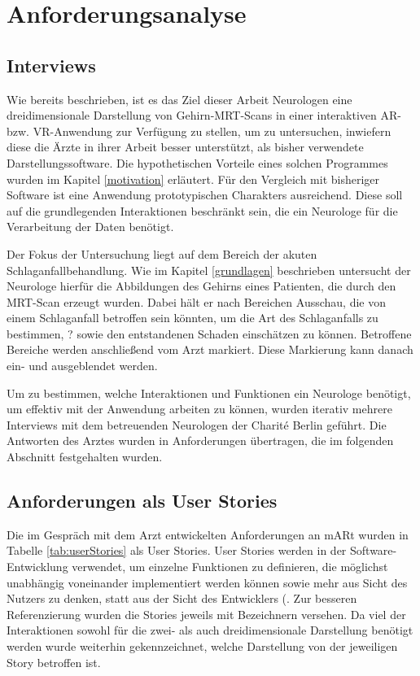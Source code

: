 
\chapter{Anforderungsanalyse}
\label{anforderung}

\section{Interviews}

Wie bereits beschrieben, ist es das Ziel dieser Arbeit Neurologen eine dreidimensionale Darstellung von Gehirn-MRT-Scans in einer interaktiven AR- bzw. VR-Anwendung zur Verfügung zu stellen, um zu untersuchen, inwiefern diese die Ärzte in ihrer Arbeit besser unterstützt, als bisher verwendete Darstellungssoftware. Die hypothetischen Vorteile eines solchen Programmes wurden im Kapitel \ref{motivation} erläutert.
Für den Vergleich mit bisheriger Software ist eine Anwendung prototypischen Charakters ausreichend. Diese soll auf die grundlegenden Interaktionen beschränkt sein, die ein Neurologe für die Verarbeitung der Daten benötigt.

Der Fokus der Untersuchung liegt auf dem Bereich der akuten Schlaganfallbehandlung. Wie im Kapitel \ref{grundlagen} beschrieben untersucht der Neurologe hierfür die Abbildungen des Gehirns eines Patienten, die durch den MRT-Scan erzeugt wurden. Dabei hält er nach Bereichen Ausschau, die von einem Schlaganfall betroffen sein könnten, um die Art des Schlaganfalls zu bestimmen, ? sowie den entstandenen Schaden einschätzen zu können. Betroffene Bereiche werden anschließend vom Arzt markiert. Diese Markierung kann danach ein- und ausgeblendet werden.

Um zu bestimmen, welche Interaktionen und Funktionen ein Neurologe benötigt, um effektiv mit der Anwendung arbeiten zu können, wurden iterativ mehrere Interviews mit dem betreuenden Neurologen der Charité Berlin geführt. Die Antworten des Arztes wurden in Anforderungen übertragen, die im folgenden Abschnitt festgehalten wurden. 

\section{Anforderungen als User Stories}

Die im Gespräch mit dem Arzt entwickelten Anforderungen an mARt wurden in Tabelle \ref{tab:userStories} als User Stories.
User Stories werden in der Software-Entwicklung verwendet, um einzelne Funktionen zu definieren, die möglichst unabhängig voneinander implementiert werden können sowie mehr aus Sicht des Nutzers zu denken, statt aus der Sicht des Entwicklers (\citet{UserStoriesApplied)}.
Zur besseren Referenzierung wurden die Stories jeweils mit Bezeichnern versehen. Da viel der Interaktionen sowohl für die zwei- als auch dreidimensionale Darstellung benötigt werden wurde weiterhin gekennzeichnet, welche Darstellung von der jeweiligen Story betroffen ist.

